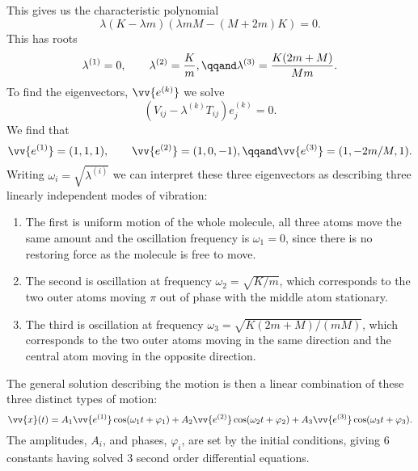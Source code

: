 \documentclass[fleqn]{NotesClass}
\begin{document}
    This gives us the characteristic polynomial
    \begin{equation}
        \lambda(K - \lambda m)(\lambda mM - (M + 2m)K) = 0.
    \end{equation}
    This has roots
    \begin{equation}
        \lambda^{(1)} = 0, \qquad \lambda^{(2)} = \frac{K}{m}, \qqand \lambda^{(3)} = \frac{K(2m + M)}{Mm}.
    \end{equation}
    To find the eigenvectors, \(\vv{e^{(k)}}\) we solve
    \begin{equation}
        (V_{ij} - \lambda^{(k)}T_{ij})e_j^{(k)} = 0.
    \end{equation}
    We find that
    \begin{equation}
        \vv{e^{(1)}} = (1, 1, 1), \qquad \vv{e^{(2)}} = (1, 0, -1), \qqand \vv{e^{(3)}} = (1, -2m/M, 1).
    \end{equation}
    Writing \(\omega_i = \sqrt{\lambda^{(i)}}\) we can interpret these three eigenvectors as describing three linearly independent modes of vibration:
    \begin{enumerate}
        \item The first is uniform motion of the whole molecule, all three atoms move the same amount and the oscillation frequency is \(\omega_1 = 0\), since there is no restoring force as the molecule is free to move.
        \item The second is oscillation at frequency \(\omega_2 = \sqrt{K/m}\), which corresponds to the two outer atoms moving \(\pi\) out of phase with the middle atom stationary.
        \item The third is oscillation at frequency \(\omega_3 = \sqrt{K(2m + M)/(mM)}\), which corresponds to the two outer atoms moving in the same direction and the central atom moving in the opposite direction.
    \end{enumerate}
        
    The general solution describing the motion is then a linear combination of these three distinct types of motion:
    \begin{equation}
        \vv{x}(t) = A_1 \vv{e^{(1)}}\cos(\omega_1t + \varphi_1) + A_2\vv{e^{(2)}}\cos(\omega_2 t + \varphi_2) + A_3 \vv{e^{(3)}} \cos(\omega_3 t + \varphi_3).
    \end{equation}
    The amplitudes, \(A_i\), and phases, \(\varphi_i\), are set by the initial conditions, giving 6 constants having solved 3 second order differential equations.
    
\end{document}
